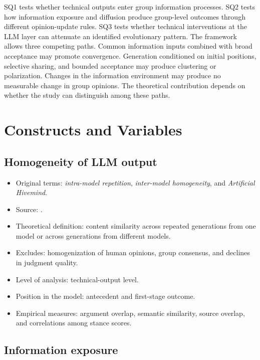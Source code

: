 \documentclass[11pt,a4paper]{article}
\newcommand{\term}[1]{\textit{#1}}
\begin{document}
SQ1 tests whether technical outputs enter group information processes. SQ2 tests how information exposure and diffusion produce group-level outcomes through different opinion-update rules. SQ3 tests whether technical interventions at the LLM layer can attenuate an identified evolutionary pattern. The framework allows three competing paths. Common information inputs combined with broad acceptance may promote convergence. Generation conditioned on initial positions, selective sharing, and bounded acceptance may produce clustering or polarization. Changes in the information environment may produce no measurable change in group opinions. The theoretical contribution depends on whether the study can distinguish among these paths.

\section{Constructs and Variables}

\subsection{Homogeneity of LLM output}

\begin{itemize}
\item Original terms: \term{intra-model repetition}, \term{inter-model homogeneity}, and \term{Artificial Hivemind}.
\item Source: \citet{jiang2025}.
\item Theoretical definition: content similarity across repeated generations from one model or across generations from different models.
\item Excludes: homogenization of human opinions, group consensus, and declines in judgment quality.
\item Level of analysis: technical-output level.
\item Position in the model: antecedent and first-stage outcome.
\item Empirical measures: argument overlap, semantic similarity, source overlap, and correlations among stance scores.
\end{itemize}

\subsection{Information exposure}
\end{document}
